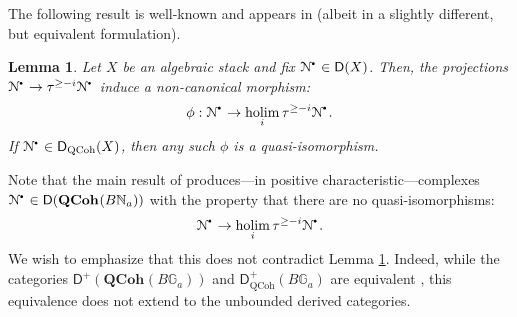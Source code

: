 \documentclass{amsart}
\theoremstyle{plain}
\newtheorem{lem}[thm]{Lemma}
\theoremstyle{definition}
\theoremstyle{remark}
\numberwithin{equation}{section}
\newcommand{\QCOHB}{\mathbf{QCoh}}
\newcommand{\QCOH}[2][]{\QCOHB^{#1}({#2})}
\newcommand{\trunc}[1]{\tau^{{#1}}}
\newcommand{\DCAT}{\mathsf{D}}
\newcommand{\shv}[1]{\mathcal{{#1}}}
\newcommand{\holim}[1]{\underset{#1}{\mathrm{holim}}\,}
\newcommand{\spref}[1]{\href{http://stacks.math.columbia.edu/tag/#1}{#1}}
\newcommand{\DQCOH}{\DCAT_{\mathrm{QCoh}}}
\newcommand{\sbt}{\,\begin{picture}(-1,-1)(0,-2)\circle*{1.5}\end{picture}\ }
\newcommand{\cplx}[1]{\shv{{#1}}^{\sbt}}
\begin{document}
The following result is well-known and appears in
\cite[\spref{08IY}]{stacks-project} (albeit in a slightly different,
but equivalent formulation). 
\begin{lem}\label{lem:lc_der_cat}
  Let $X$ be an algebraic stack and fix $\cplx{N}\in \DCAT(X)$. Then,
  the projections $\cplx{N} \to \trunc{\geq -i}\cplx{N}$ induce a
  non-canonical morphism:
  \[
  \phi : \cplx{N} \to \holim{i} \trunc{\geq -i}\cplx{N}.
  \]
  If $\cplx{N} \in \DQCOH(X)$, then any such $\phi$ is a quasi-isomorphism.
\end{lem}
Note that the main result of \cite{2011arXiv1103.5539N}
produces---in positive characteristic---complexes $\cplx{N} \in
\DCAT(\QCOH{B\mathbb{N}_a})$ with the property that there are no quasi-isomorphisms: 
\[
\cplx{N} \to \holim{i} \trunc{\geq -i} \cplx{N}.
\]
We wish to emphasize that this does not contradict Lemma 
\ref{lem:lc_der_cat}. Indeed, while the categories
$\DCAT^+(\QCOH{B\mathbb{G}_a})$ and $\DQCOH^+(B\mathbb{G}_a)$ are
equivalent \cite[Thm.~3.8]{lurie_tannaka}, this equivalence does not
extend to the unbounded derived categories. 
\end{document}

